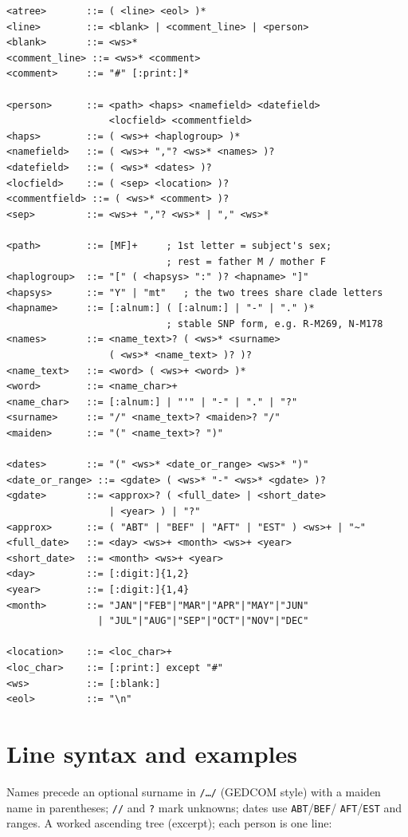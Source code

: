 \documentclass[11pt]{article}
\begin{document}
\begin{verbatim}
<atree>       ::= ( <line> <eol> )*
<line>        ::= <blank> | <comment_line> | <person>
<blank>       ::= <ws>*
<comment_line> ::= <ws>* <comment>
<comment>     ::= "#" [:print:]*

<person>      ::= <path> <haps> <namefield> <datefield>
                  <locfield> <commentfield>
<haps>        ::= ( <ws>+ <haplogroup> )*
<namefield>   ::= ( <ws>+ ","? <ws>* <names> )?
<datefield>   ::= ( <ws>* <dates> )?
<locfield>    ::= ( <sep> <location> )?
<commentfield> ::= ( <ws>* <comment> )?
<sep>         ::= <ws>+ ","? <ws>* | "," <ws>*

<path>        ::= [MF]+     ; 1st letter = subject's sex;
                            ; rest = father M / mother F
<haplogroup>  ::= "[" ( <hapsys> ":" )? <hapname> "]"
<hapsys>      ::= "Y" | "mt"   ; the two trees share clade letters
<hapname>     ::= [:alnum:] ( [:alnum:] | "-" | "." )*
                            ; stable SNP form, e.g. R-M269, N-M178
<names>       ::= <name_text>? ( <ws>* <surname>
                  ( <ws>* <name_text> )? )?
<name_text>   ::= <word> ( <ws>+ <word> )*
<word>        ::= <name_char>+
<name_char>   ::= [:alnum:] | "'" | "-" | "." | "?"
<surname>     ::= "/" <name_text>? <maiden>? "/"
<maiden>      ::= "(" <name_text>? ")"

<dates>       ::= "(" <ws>* <date_or_range> <ws>* ")"
<date_or_range> ::= <gdate> ( <ws>* "-" <ws>* <gdate> )?
<gdate>       ::= <approx>? ( <full_date> | <short_date>
                  | <year> ) | "?"
<approx>      ::= ( "ABT" | "BEF" | "AFT" | "EST" ) <ws>+ | "~"
<full_date>   ::= <day> <ws>+ <month> <ws>+ <year>
<short_date>  ::= <month> <ws>+ <year>
<day>         ::= [:digit:]{1,2}
<year>        ::= [:digit:]{1,4}
<month>       ::= "JAN"|"FEB"|"MAR"|"APR"|"MAY"|"JUN"
                | "JUL"|"AUG"|"SEP"|"OCT"|"NOV"|"DEC"

<location>    ::= <loc_char>+
<loc_char>    ::= [:print:] except "#"
<ws>          ::= [:blank:]
<eol>         ::= "\n"
\end{verbatim}

\section{Line syntax and examples}
\label{sec:examples}
Names precede an optional surname in \texttt{/\dots/} (GEDCOM style) with a maiden name in
parentheses; \texttt{//} and \texttt{?} mark unknowns; dates use \texttt{ABT}/\texttt{BEF}/%
\texttt{AFT}/\texttt{EST} and ranges. A worked ascending tree (excerpt); each person is one line:
\end{document}
